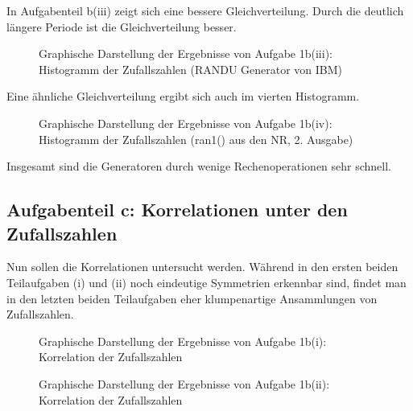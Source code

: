 In Aufgabenteil b(iii) zeigt sich eine bessere Gleichverteilung.
Durch die deutlich längere Periode ist die Gleichverteilung besser.

\begin{landscape}
	\begin{figure}
		\caption{Graphische Darstellung der Ergebnisse von Aufgabe 1b(iii): Histogramm der Zufallszahlen (RANDU Generator von IBM)}
		\label{fig:1b3}
	\end{figure}
\end{landscape}

Eine ähnliche Gleichverteilung ergibt sich auch im vierten Histogramm.
\begin{landscape}
	\begin{figure}
		\caption{Graphische Darstellung der Ergebnisse von Aufgabe 1b(iv): Histogramm der Zufallszahlen (ran1() aus den NR, 2. Ausgabe)}
		\label{fig:1b4}
	\end{figure}
\end{landscape}

Insgesamt sind die Generatoren durch wenige Rechenoperationen sehr schnell.

\subsection*{Aufgabenteil c: Korrelationen unter den Zufallszahlen}
Nun sollen die Korrelationen untersucht werden. Während in den ersten beiden Teilaufgaben (i) und (ii) noch eindeutige Symmetrien erkennbar sind, findet man in den letzten beiden Teilaufgaben eher klumpenartige Ansammlungen von Zufallszahlen.

\begin{landscape}
	\begin{figure}
		\caption{Graphische Darstellung der Ergebnisse von Aufgabe 1b(i): Korrelation der Zufallszahlen}
		\label{fig:1b1korr}
	\end{figure}
\end{landscape}

\begin{landscape}
	\begin{figure}
		\caption{Graphische Darstellung der Ergebnisse von Aufgabe 1b(ii): Korrelation der Zufallszahlen}
		\label{fig:1b2korr}
	\end{figure}
\end{landscape}



